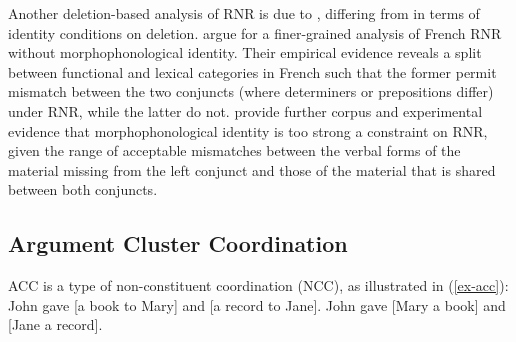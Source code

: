{Another deletion-based analysis of RNR is due to \citet{Abeille2016, Shiraishi2019}, differing from \citet{Chaves2014} in terms of identity conditions on deletion. \citet{Abeille2016} argue for a finer-grained analysis of French RNR without morphophonological identity. Their empirical evidence reveals a split between functional and lexical categories in French such that the former permit mismatch between the two conjuncts (where determiners or prepositions differ) under RNR, while the latter do not. \citet{Shiraishi2019} provide further corpus and experimental evidence that morphophonological identity is too strong a constraint on RNR, given the range of acceptable mismatches between the verbal forms of the material missing from the left conjunct and those of the material that is shared between both conjuncts.

\iffalse{
To illustrate, an English verb form mismatch is depicted in (\ref{verbform}), from \citep[see][5]{Shiraishi2019}, where the left conjunct requires a participle while the shared material contains an infinitive form of the verb \textit{appear}.

\ea Some new hybrid models already have, and others soon will appear in the automobile industry.\label{verbform}

\citep{Shiraishi2019} capture verb form mismatch of this kind by introducing into their analysis of RNR the feature LID, which carries lexeme identity information. That is, this feature ensures semantic and syntactic category identity but ignores differences introduced by inflectional suffixes, with the result that the participle and the infinitive in (\ref{verbform}) count as lexeme-identical. RNR is licensed by including the LID feature in the MP feature also used in \citet{Chaves2014} (see (\ref{bpd})).
}\fi


\subsection{Argument Cluster Coordination}

ACC is a type of non-constituent coordination (NCC), as
illustrated in (\ref{ex-acc}):
%
%
\eal
\label{ex-acc}
\ex John gave [a book to Mary] and [a record to Jane].   \label{acc-here}
\ex John gave [Mary a book] and [Jane a record].  \label{acc-1}
\zl
%
%

}
